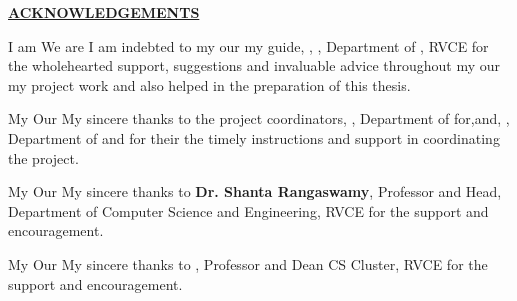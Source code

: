 \thispagestyle{empty}
\ifIDP \vspace{-1cm}\fi
\begin{center}
	\Large\textbf{\underline{ACKNOWLEDGEMENTS}} \par
\end{center}

\ifPG I am \else
\ifStuNameBUsed We are \else I am \fi\fi indebted to \ifPG my \else\ifStuNameBUsed our \else my \fi\fi guide, \textbf{\printGuideNameA}, \printGuideDesigA, Department of \printGuideDeptAInLF, RVCE for the wholehearted support, suggestions and invaluable advice throughout \ifPG my \else\ifStuNameBUsed our \else my \fi\fi project work and also helped in the preparation of this thesis.\\ \par

\ifPG My \else \ifStuNameBUsed Our \else My \fi\fi sincere thanks to the project coordinator\ifIDP\else\ifProjectMemBUsed s\fi\fi\space \textbf{\printProjectMemberA}, \printProjectMemberDesigA, Department of \printProjectMemberDeptAInLF \ifIDP \space for\space \else\ifProjectMemBUsed \ifProjectMemCUsed,\space \else\space and\space \fi\textbf{\printProjectMemberB}, \printProjectMemberDesigB, Department of \printProjectMemberDeptBInLF\ifProjectMemCUsed\space and \textbf{\printProjectMemberC} \fi\fi\space for \ifProjectMemBUsed their \else the \fi\fi timely instructions and support in coordinating the project.\\ \par

\ifPG My \else \ifStuNameBUsed Our \else My \fi\fi sincere thanks to \textbf{Dr. Shanta Rangaswamy}, Professor and Head, Department of Computer Science and Engineering, RVCE for the support and encouragement.\\ \par

\ifPG My \else \ifStuNameBUsed Our \else My \fi\fi sincere thanks to \textbf{\printHOD}, Professor and Dean CS Cluster, RVCE for the support and encouragement.\\ \par

